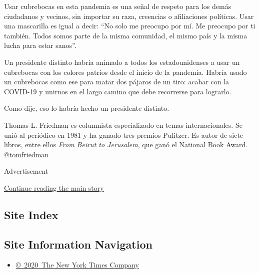 Usar cubrebocas en esta pandemia es una señal de respeto para los demás
ciudadanos y vecinos, sin importar su raza, creencias o afiliaciones
políticas. Usar una mascarilla es igual a decir: ``No solo me preocupo
por mí. Me preocupo por ti también. Todos somos parte de la misma
comunidad, el mismo país y la misma lucha para estar sanos''.

Un presidente distinto habría animado a todos los estadounidenses a usar
un cubrebocas con los colores patrios desde el inicio de la pandemia.
Habría usado un cubrebocas como ese para matar dos pájaros de un tiro:
acabar con la COVID-19 y unirnos en el largo camino que debe recorrerse
para lograrlo.

Como dije, eso lo habría hecho un presidente distinto.

Thomas L. Friedman es columnista especializado en temas internacionales.
Se unió al periódico en 1981 y ha ganado tres premios Pulitzer. Es autor
de siete libros, entre ellos \emph{From Beirut to Jerusalem}, que ganó
el National Book Award.
\href{https://twitter.com/tomfriedman}{@tomfriedman}

Advertisement

\protect\hyperlink{after-bottom}{Continue reading the main story}

\hypertarget{site-index}{%
\subsection{Site Index}\label{site-index}}

\hypertarget{site-information-navigation}{%
\subsection{Site Information
Navigation}\label{site-information-navigation}}

\begin{itemize}
\tightlist
\item
  \href{https://help.nytimes3xbfgragh.onion/hc/en-us/articles/115014792127-Copyright-notice}{©~2020~The
  New York Times Company}
\end{itemize}

